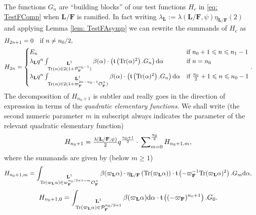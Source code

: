 \documentclass[A4]{amsart}
\def\leq{\leqslant}
\def\geq{\geqslant}
\numberwithin{equation}{section} \everymath{\displaystyle}
\newcommand{\Tr}{{\rm Tr}}
\newcommand{\ud}{\mathrm{d}}
\newcommand{\F}{\mathbf{F}}
\newcommand{\bL}{\mathbf{L}}
\newcommand{\vO}{\mathcal{O}}
\newcommand{\vP}{\mathcal{P}}
\newcommand{\Trans}{\mathfrak{t}}
\begin{document}
	The functions $G_n$ are ``building blocks'' of our test functions $H_c$ in \eqref{eq: TestFComp} when $\bL/\F$ is ramified. In fact writing $\lambda_{\bL} := \lambda(\bL/\F, \psi) \eta_{\bL/\F}(2)$ and applying Lemma \ref{lem: TestFAsymp} we can rewrite the summands of $H_c$ as
\begin{align}
	&H_{2n+1} = 0 \quad \text{if } n \neq n_0/2, \label{eq: FPTestFR0} \\
	&H_{2n} = \begin{cases}
		E_n & \text{if } n_0+1 \leq n \leq n_1-1 \\
		\lambda_{\bL}q^n \int_{\substack{\bL^1 \\ \Tr(\alpha) \in 2(1+\vP_{\F}^{n_0-1})}} \beta(\alpha) \cdot \left( \Trans \left( \Tr(\alpha)^2 \right).G_n \right) \ud \alpha & \text{if } n = n_0 \\
		\lambda_{\bL}q^n \int_{\substack{\bL^1 \\ \Tr(\alpha) \in 2(1+\varpi_{\F}^{2n-n_0-1} \vO_{\F}^{\times})}} \beta(\alpha) \cdot \left( \Trans \left( \Tr(\alpha)^2 \right).G_n \right) \ud \alpha & \text{if } \tfrac{n_0}{2}+1 \leq n \leq n_0-1
	\end{cases}. \label{eq: FPTestFR1}
\end{align}
	The decomposition of $H_{n_0+1}$ is subtler and really goes in the direction of expression in terms of the \emph{quadratic elementary functions}. We shall write (the second numeric parameter $m$ in subscript always indicates the parameter of the relevant quadratic elementary function)
\begin{equation} \label{eq: FPTestFR2}
	H_{n_0+1} = \tfrac{\lambda(\bL/\F,\psi)}{2} q^{\frac{n_0+1}{2}} \cdot \sideset{}{_{m=0}^{\frac{n_0}{2}}} \sum H_{n_0+1,m},
\end{equation}
	where the summands are given by (below $m \geq 1$)
	$$ H_{n_0+1,m} = \int_{\substack{\bL^1 \\ \Tr(\varpi_{\bL} \alpha) \in \varpi_{\F}^{n_0/2+1-m} \vO_{\F}^{\times}}} \beta(\varpi_{\bL} \alpha) \cdot \eta_{\bL/\F} \left( \Tr(\varpi_{\bL}\alpha) \right) \cdot \Trans \left( -\varpi_{\F}^{-1} \Tr(\varpi_{\bL} \alpha)^2 \right).G_m \ud \alpha, $$
	$$ H_{n_0+1,0} = \int_{\substack{\bL^1 \\ \Tr(\varpi_{\bL} \alpha) \in \vP_{\F}^{n_0/2+1}}} \beta(\varpi_{\bL} \alpha) \ud \alpha \cdot \Trans \left( (-\varpi_{\F})^{n_0+1} \right).G_0. $$
	
\end{document}
